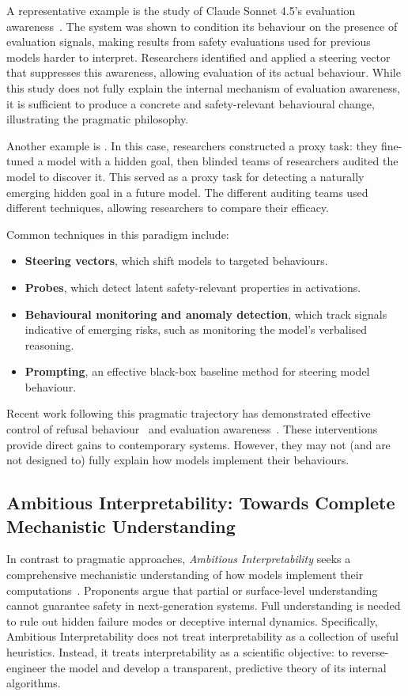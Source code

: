 A representative example is the study of Claude Sonnet 4.5’s evaluation awareness~. The system was shown to condition its behaviour on the presence of evaluation signals, making results from safety evaluations used for previous models harder to interpret. Researchers identified and applied a steering vector that suppresses this awareness, allowing evaluation of its actual behaviour. While this study does not fully explain the internal mechanism of evaluation awareness, it is sufficient to produce a concrete and safety-relevant behavioural change, illustrating the pragmatic philosophy.

Another example is . In this case, researchers constructed a proxy task: they fine-tuned a model with a hidden goal, then blinded teams of researchers audited the model to discover it. This served as a proxy task for detecting a naturally emerging hidden goal in a future model. The different auditing teams used different techniques, allowing researchers to compare their efficacy.

Common techniques in this paradigm include:
\begin{itemize}
\item \textbf{Steering vectors}, which shift models to targeted behaviours.
\item \textbf{Probes}, which detect latent safety-relevant properties in activations.
\item \textbf{Behavioural monitoring and anomaly detection}, which track signals indicative of emerging risks, such as monitoring the model's verbalised reasoning.

\item \textbf{Prompting}, an effective black-box baseline method for steering model behaviour.
\end{itemize}

Recent work following this pragmatic trajectory has demonstrated effective control of refusal behaviour~ and evaluation awareness~. These interventions provide direct gains to contemporary systems. However, they may not (and are not designed to) fully explain how models implement their behaviours.

\subsection{Ambitious Interpretability: Towards Complete Mechanistic Understanding}
\label{subsec:ambitious}
In contrast to pragmatic approaches, \emph{Ambitious Interpretability} seeks a comprehensive mechanistic understanding of how models implement their computations~. Proponents argue that partial or surface-level understanding cannot guarantee safety in next-generation systems. Full understanding is needed to rule out hidden failure modes or deceptive internal dynamics. Specifically, Ambitious Interpretability does not treat interpretability as a collection of useful heuristics. Instead, it treats interpretability as a scientific objective: to reverse-engineer the model and develop a transparent, predictive theory of its internal algorithms.

